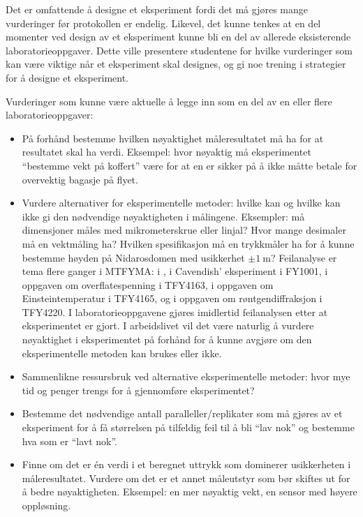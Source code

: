 \documentclass{article}
\begin{document}
Det er omfattende å designe et eksperiment fordi det må gjøres mange vurderinger før protokollen er endelig. Likevel, det kunne tenkes at en del momenter ved design av et eksperiment kunne bli en del av allerede eksisterende laboratorieoppgaver. Dette ville presentere studentene for hvilke vurderinger som kan være viktige når et eksperiment skal designes, og gi noe trening i strategier for å designe et eksperiment.

Vurderinger som kunne være aktuelle å legge inn som en del av en eller flere laboratorieoppgaver:
\begin{itemize}
  \item På forhånd bestemme hvilken nøyaktighet måleresultatet må ha for at resultatet skal ha verdi. Eksempel: hvor nøyaktig må eksperimentet ``bestemme vekt på koffert'' være for at en er sikker på å ikke måtte betale for overvektig bagasje på flyet.
  \item Vurdere alternativer for eksperimentelle metoder: hvilke kan og hvilke kan ikke gi den nødvendige nøyaktigheten i målingene. Eksempler: må dimensjoner måles med mikrometerskrue eller linjal? Hvor mange desimaler må en vektmåling ha? Hvilken spesifikasjon må en trykkmåler ha for å kunne bestemme høyden på Nidarosdomen med usikkerhet $\pm\SI{1}{\meter}$? Feilanalyse er tema flere ganger i MTFYMA: i \cite{Persson2020}, i Cavendish’ eksperiment i FY1001, i oppgaven om overflatespenning i TFY4163, i oppgaven om Einsteintemperatur i TFY4165, og i oppgaven om røntgendiffraksjon i TFY4220. I laboratorieoppgavene gjøres imidlertid feilanalysen etter at eksperimentet er gjort. I arbeidslivet vil det være naturlig å vurdere nøyaktighet i eksperimentet på forhånd for å kunne avgjøre om den eksperimentelle metoden kan brukes eller ikke.
  \item Sammenlikne ressursbruk ved alternative eksperimentelle metoder: hvor mye tid og penger trengs for å gjennomføre eksperimentet?
  \item Bestemme det nødvendige antall paralleller/replikater som må gjøres av et eksperiment for å få størrelsen på tilfeldig feil til å bli ``lav nok'' og bestemme hva som er ``lavt nok''.
  \item Finne om det er én verdi i et beregnet uttrykk som dominerer usikkerheten i måleresultatet. Vurdere om det er et annet måleutstyr som bør skiftes ut for å bedre nøyaktigheten. Eksempel: en mer nøyaktig vekt, en sensor med høyere oppløsning.

\end{itemize}
\end{document}
